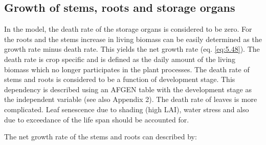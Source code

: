 %
%

\subsection{Growth of stems, roots and storage organs}

In the model, the death rate of the storage organs is considered to be zero. For the roots
and the stems increase in living biomass can be easily determined as the growth rate
minus death rate. This yields the net growth rate (eq. \ref{eq:5.48}). The death rate is crop
specific and is defined as the daily amount of the living biomass which no longer
participates in the plant processes. The death rate of stems and roots is considered to be a
function of development stage. This dependency is described using an
AFGEN table with the development stage as the independent variable (see also Appendix
2). The death rate of leaves is more complicated. Leaf senescence due to shading (high
LAI), water stress and also due to exceedance of the life span should be accounted for.

The net growth rate of the stems and roots can described by:

